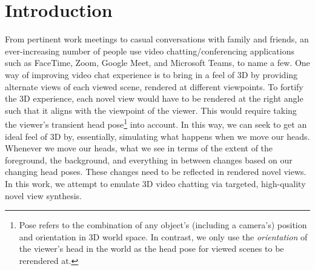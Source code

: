 \chapter{Introduction}\label{ch1:introduction}
 
From pertinent work meetings to casual conversations with family and friends, an ever-increasing number of people use video chatting/conferencing applications such as FaceTime, Zoom, Google Meet, and Microsoft Teams, to name a few. One way of improving video chat experience is to bring in a feel of 3D by providing alternate views of each viewed scene, rendered at different viewpoints. To fortify the 3D experience, each novel view would have to be rendered at the right angle such that it aligns with the viewpoint of the viewer. This would require taking the viewer's transient head pose\footnote{Pose refers to the combination of any object's (including a camera's) position and orientation in 3D world space. In contrast, we only use the \textit{orientation} of the viewer's head in the world as the head pose for viewed scenes to be rerendered at.} into account. In this way, we can seek to get an ideal feel of 3D by, essentially, simulating what happens when we move our heads. Whenever we move our heads, what we see in terms of the extent of the foreground, the background, and everything in between changes based on our changing head poses. These changes need to be reflected in rendered novel views. In this work, we attempt to emulate 3D video chatting via targeted, high-quality novel view synthesis.



